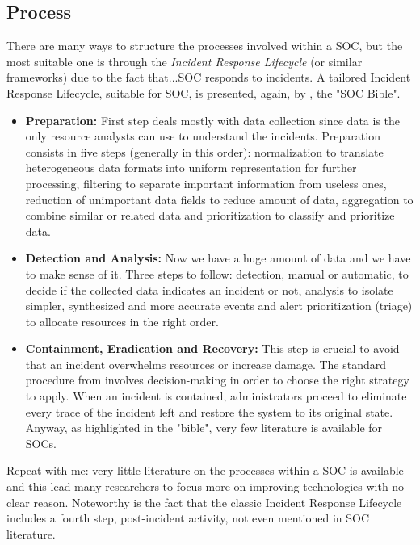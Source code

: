 \subsection{Process}
There are many ways to structure the processes involved within a SOC, but the most suitable one is through the \textit{Incident Response Lifecycle} (or similar frameworks) due to the fact that...SOC responds to incidents. A tailored Incident Response Lifecycle, suitable for SOC, is presented, again, by \cite{Vielberth2020}, the "SOC Bible".
\begin{itemize}
    \item \textbf{Preparation:} First step deals mostly with data collection since data is the only resource analysts can use to understand the incidents. Preparation consists in five steps (generally in this order): normalization to translate heterogeneous data formats into uniform representation for further processing, filtering to separate important information from useless ones, reduction of unimportant data fields to reduce amount of data, aggregation to combine similar or related data and prioritization to classify and prioritize data.
    \item \textbf{Detection and Analysis:} Now we have a huge amount of data and we have to make sense of it. Three steps to follow: detection, manual or automatic, to decide if the collected data indicates an incident or not, analysis to isolate simpler, synthesized and more accurate events and alert prioritization (triage) to allocate resources in the right order.
    \item \textbf{Containment, Eradication and Recovery:} This step is crucial to avoid that an incident overwhelms resources or increase damage. The standard procedure from \cite{Cichonski2012} involves decision-making in order to choose the right strategy to apply. When an incident is contained, administrators proceed to eliminate every trace of the incident left and restore the system to its original state. Anyway, as highlighted in the "bible", very few literature is available for SOCs.
\end{itemize}
Repeat with me: very little literature on the processes within a SOC is available and this lead many researchers to focus more on improving technologies with no clear reason. Noteworthy is the fact that the classic Incident Response Lifecycle includes a fourth step, post-incident activity, not even mentioned in SOC literature.

